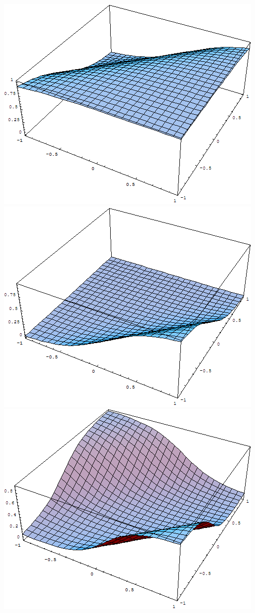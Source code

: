 \documentclass{article}
\begin{document}
\begin{enumerate}
    \begin{center}
      \includegraphics[scale=.35]{hidden2.png}
      \includegraphics[scale=.35]{hidden1.png}
      \includegraphics[scale=.35]{output.png}
    \end{center}


\end{enumerate}
\end{document}

